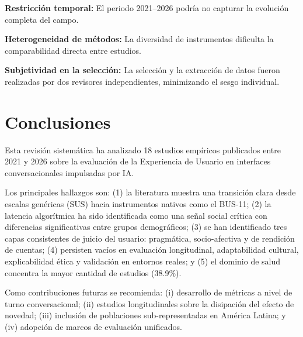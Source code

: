\documentclass[11pt,twocolumn]{article}
\begin{document}
\textbf{Restricción temporal:} El periodo 2021--2026 podría no capturar la evolución completa del campo.

\textbf{Heterogeneidad de métodos:} La diversidad de instrumentos dificulta la comparabilidad directa entre estudios.

\textbf{Subjetividad en la selección:} La selección y la extracción de datos fueron realizadas por dos revisores independientes, minimizando el sesgo individual.

\section{Conclusiones}

Esta revisión sistemática ha analizado 18 estudios empíricos publicados entre 2021 y 2026 sobre la evaluación de la Experiencia de Usuario en interfaces conversacionales impulsadas por IA.

Los principales hallazgos son: (1) la literatura muestra una transición clara desde escalas genéricas (SUS) hacia instrumentos nativos como el BUS-11; (2) la latencia algorítmica ha sido identificada como una señal social crítica con diferencias significativas entre grupos demográficos; (3) se han identificado tres capas consistentes de juicio del usuario: pragmática, socio-afectiva y de rendición de cuentas; (4) persisten vacíos en evaluación longitudinal, adaptabilidad cultural, explicabilidad ética y validación en entornos reales; y (5) el dominio de salud concentra la mayor cantidad de estudios (38.9\%).

Como contribuciones futuras se recomienda: (i) desarrollo de métricas a nivel de turno conversacional; (ii) estudios longitudinales sobre la disipación del efecto de novedad; (iii) inclusión de poblaciones sub-representadas en América Latina; y (iv) adopción de marcos de evaluación unificados.
\end{document}
